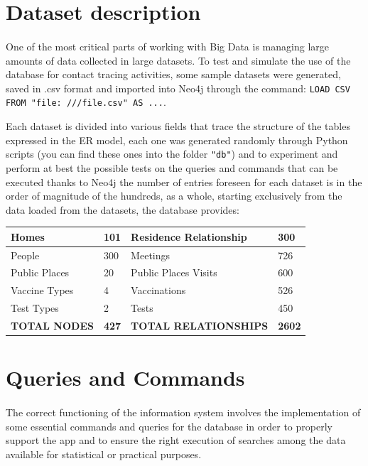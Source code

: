 \documentclass[a4paper,12pt]{article}
\begin{document}
\section{Dataset description}
\paragraph{} One of the most critical parts of working with Big Data is managing large amounts of data collected in large datasets. To test and simulate the use of the database for contact tracing activities, some sample datasets were generated, saved in .csv format and imported into Neo4j through the command: \texttt{LOAD CSV FROM "file: ///file.csv" AS ...}. \par
Each dataset is divided into various fields that trace the structure of the tables expressed in the ER model, each one was generated randomly through Python scripts (you can find these ones into the folder \texttt{"db"}) and to experiment and perform at best the possible tests on the queries and commands that can be executed thanks to Neo4j the number of entries foreseen for each dataset is in the order of magnitude of the hundreds, as a whole, starting exclusively from the data loaded from the datasets, the database provides:
\begin{center}
\begin{tabular}{|l|l|l|l|}
\hline
Homes & 101 & Residence Relationship & 300 \\
\hline
People & 300 & Meetings & 726 \\
\hline
Public Places & 20 & Public Places Visits & 600 \\
\hline
Vaccine Types & 4 & Vaccinations & 526 \\
\hline
Test Types & 2 & Tests & 450\\
\hline
\textbf{TOTAL NODES} & \textbf{427} & \textbf{TOTAL RELATIONSHIPS} & \textbf{2602}\\
\hline
\end{tabular}
\end{center}
\section{Queries and Commands}
\paragraph{} The correct functioning of the information system involves the implementation of some essential commands and queries for the database in order to properly support the app and to ensure the right execution of searches among the data available for statistical or practical purposes. \par
\end{document}
